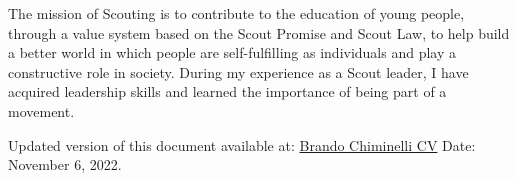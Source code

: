 \documentclass[10pt,a4paper]{altacv}
\begin{document}
The mission of Scouting is to contribute to the education of young people, through a value system based on the Scout Promise and Scout Law, to help build a better world in which people are self-fulfilling as individuals and play a constructive role in society.
During my experience as a Scout leader, I have acquired leadership skills and learned the importance of being part of a movement.

\medskip
\medskip

Updated version of this document available at: \href{https://github.com/Bralli99/CurriculumVitae/blob/e0ccac5747b84b1ad0b39f3462545507e19a3d18/Brando_Chiminelli_CV.pdf}{Brando Chiminelli CV}
Date: November 6, 2022.
\end{document}
